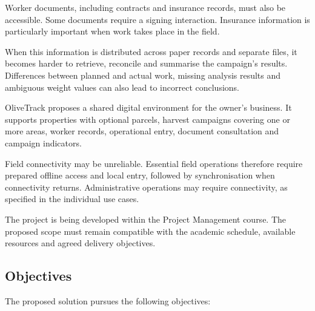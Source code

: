Worker documents, including contracts
and insurance records, must also be accessible.
Some documents require a signing interaction.
Insurance information is particularly important
when work takes place in the field.

When this information is distributed across
paper records and separate files,
it becomes harder to retrieve, reconcile
and summarise the campaign's results.
Differences between planned and actual work,
missing analysis results and ambiguous weight values
can also lead to incorrect conclusions.

OliveTrack proposes a shared digital environment
for the owner's business.
It supports properties with optional parcels,
harvest campaigns covering one or more areas,
worker records, operational entry,
document consultation and campaign indicators.

Field connectivity may be unreliable.
Essential field operations therefore require
prepared offline access and local entry,
followed by synchronisation when connectivity returns.
Administrative operations may require connectivity,
as specified in the individual use cases.

The project is being developed within the
Project Management course.
The proposed scope must remain compatible
with the academic schedule,
available resources and agreed delivery objectives.

\subsection{Objectives}

The proposed solution pursues the following objectives:

